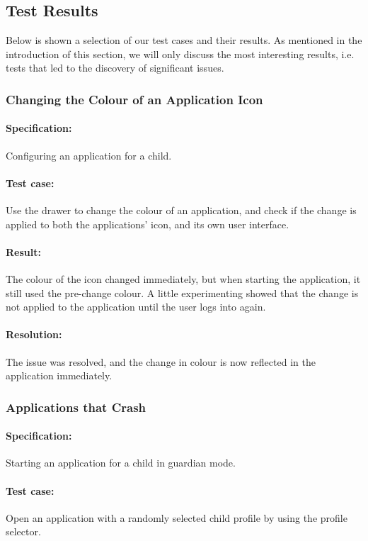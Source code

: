 \subsection{Test Results}\label{sec:sprint1:testing_results}
Below is shown a selection of our test cases and their results.
As mentioned in the introduction of this section, we will only discuss the most interesting results, i.e. tests that led to the discovery of significant issues.


\subsubsection{Changing the Colour of an Application Icon}

\paragraph{Specification:} Configuring an application for a child.
\paragraph{Test case:} Use the drawer to change the colour of an application, and check if the change is applied to both the applications' icon, and its own user interface.
\paragraph{Result:} The colour of the icon changed immediately, but when starting the application, it still used the pre-change colour. 
A little experimenting showed that the change is not applied to the application until the user logs into \launcher again.
\paragraph{Resolution:} The issue was resolved, and the change in colour is now reflected in the application immediately.

\subsubsection{Applications that Crash \launcher}

\paragraph{Specification:} Starting an application for a child in guardian mode.
\paragraph{Test case:} Open an application with a randomly selected child profile by using the profile selector.
